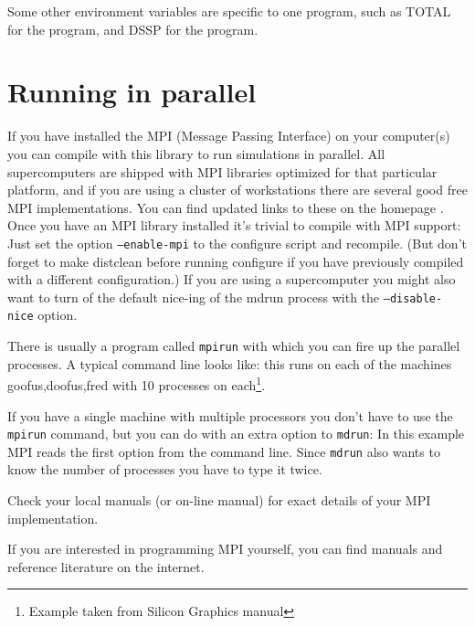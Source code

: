 Some other environment variables are specific to one program, such as
TOTAL for the  program, and DSSP for the
 program.

\section{Running {\gromacs} in parallel}
If you have installed the MPI (Message Passing Interface) on your computer(s)
you can compile {\gromacs} with this library to run simulations in parallel. 
All supercomputers are shipped with MPI libraries optimized for 
that particular platform, and if you are using a cluster of workstations
there are several good free MPI implementations. You can find updated links
to these on the {\gromacs} homepage {\wwwpage}. Once you have an MPI library
installed it's trivial to compile {\gromacs} with MPI support: Just set
the option {\tt --enable-mpi} to the configure script and recompile.
(But don't forget to make distclean before running configure if you have
previously compiled with a different configuration.) If you are using a 
supercomputer you might also want to turn of the default nice-ing of the
mdrun process with the {\tt --disable-nice} option.

There is usually a program called {\tt mpirun} with which you can fire
up the parallel processes. A typical command line looks like:
this runs on each of the machines goofus,doofus,fred with 10 processes
on each\footnote{Example taken from Silicon Graphics manual}.

If you have a single machine with multiple processors you don't have to
use the {\tt mpirun} command, but you can do with an extra option to
{\tt mdrun}:
In this example MPI reads the first option from the command line.
Since {\tt mdrun} also wants to know the number of processes you have to
type it twice.

Check your local manuals (or on-line manual) for exact details
of your MPI implementation.

If you are interested in programming MPI yourself, you can find
manuals and reference literature on the internet.



